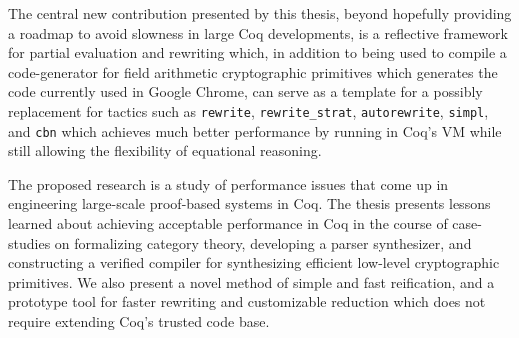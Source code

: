 The central new contribution presented by this thesis, beyond hopefully providing a roadmap to avoid slowness in large Coq developments, is a reflective framework for partial evaluation and rewriting which, in addition to being used to compile a code-generator for field arithmetic cryptographic primitives which generates the code currently used in Google Chrome, can serve as a template for a possibly replacement for tactics such as \texttt{rewrite}, \texttt{rewrite\_strat}, \texttt{autorewrite}, \texttt{simpl}, and \texttt{cbn} which achieves much better performance by running in Coq's VM while still allowing the flexibility of equational reasoning.


The proposed research is a study of performance issues that come up in engineering large-scale proof-based systems in Coq.
The thesis presents lessons learned about achieving acceptable performance in Coq in the course of case-studies on formalizing category theory, developing a parser synthesizer, and constructing a verified compiler for synthesizing efficient low-level cryptographic primitives.
We also present a novel method of simple and fast reification, and a prototype tool for faster rewriting and customizable reduction which does not require extending Coq's trusted code base.
